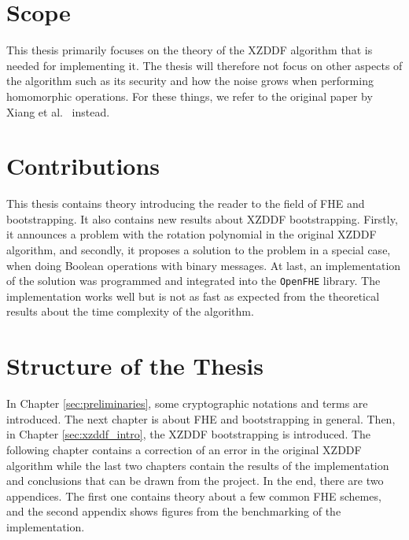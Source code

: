 \section{Scope}
This thesis primarily focuses on the theory of the XZDDF algorithm that is needed for implementing it. The thesis will therefore not focus on other aspects of the algorithm such as its security and how the noise grows when performing homomorphic operations. For these things, we refer to the original paper by Xiang et al.~\cite{cite:fast_bootstrap_crypto23} instead.


\section{Contributions}

This thesis contains theory introducing the reader to the field of FHE and bootstrapping. It also contains new results about XZDDF bootstrapping. Firstly, it announces a problem with the rotation polynomial in the original XZDDF algorithm, and secondly, it proposes a solution to the problem in a special case, when doing Boolean operations with binary messages. At last, an implementation of the solution was programmed and integrated into the \texttt{OpenFHE} library. The implementation works well but is not as fast as expected from the theoretical results about the time complexity of the algorithm.


\section{Structure of the Thesis}

In Chapter \ref{sec:preliminaries}, some cryptographic notations and terms are introduced. The next chapter is about FHE and bootstrapping in general. Then, in Chapter \ref{sec:xzddf_intro}, the XZDDF bootstrapping is introduced. The following chapter contains a correction of an error in the original XZDDF algorithm while the last two chapters contain the results of the implementation and conclusions that can be drawn from the project. In the end, there are two appendices. The first one contains theory about a few common FHE schemes, and the second appendix shows figures from the benchmarking of the implementation.